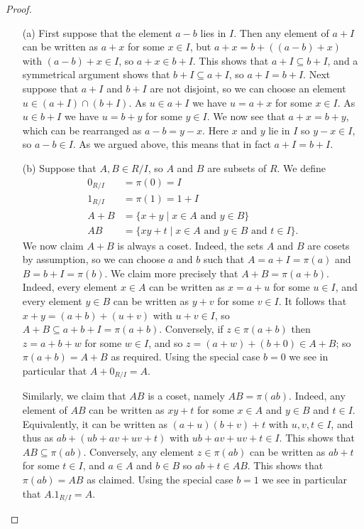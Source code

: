 \documentclass{amsart}
\newcommand{\st}        {\;|\;}
\newcommand{\sse}       {\subseteq}
\renewcommand{\:}{\colon}
\theoremstyle{definition}
\begin{document}
\begin{proof}
 \begin{itemize}
  \item[(a)] First suppose that the element $a-b$ lies in $I$.
   Then any element of $a+I$ can be written as $a+x$ for some
   $x\in I$,  but $a+x=b+((a-b)+x)$ with $(a-b)+x\in I$, so
   $a+x\in b+I$.  This shows that $a+I\sse b+I$, and a symmetrical
   argument shows that $b+I\sse a+I$, so $a+I=b+I$.  Next suppose that
   $a+I$ and $b+I$ are not disjoint, so we can choose an element
   $u\in(a+I)\cap(b+I)$.  As $u\in a+I$ we have $u=a+x$ for some
   $x\in I$.  As $u\in b+I$ we have $u=b+y$ for some $y\in I$.  We now
   see that $a+x=b+y$, which can be rearranged as $a-b=y-x$.  Here $x$
   and $y$ lie in $I$ so $y-x\in I$, so $a-b\in I$.  As we argued
   above, this means that in fact $a+I=b+I$.
  \item[(b)] Suppose that $A,B\in R/I$, so $A$ and $B$ are subsets of
   $R$.  We define 
   \begin{align*}
    0_{R/I} &= \pi(0) = I \\
    1_{R/I} &= \pi(1) = 1 + I \\
    A+B &= \{x+y\st x\in A\text{ and } y\in B\} \\
    AB &= \{xy+t\st x\in A\text{ and } y\in B \text{ and } t\in I\}.
   \end{align*}
   We now claim $A+B$ is always a coset.  Indeed, the sets $A$ and $B$
   are cosets by assumption, so we can choose $a$ and $b$ such that
   $A=a+I=\pi(a)$ and $B=b+I=\pi(b)$.  We claim more precisely that
   $A+B=\pi(a+b)$.  Indeed, every element $x\in A$ can be written as
   $x=a+u$ for some $u\in I$, and every element $y\in B$ can be
   written as $y+v$ for some $v\in I$.  It follows that
   $x+y=(a+b)+(u+v)$ with $u+v\in I$, so $A+B\sse a+b+I=\pi(a+b)$.
   Conversely, if $z\in\pi(a+b)$ then $z=a+b+w$ for some $w\in I$,
   and so $z=(a+w)+(b+0)\in A+B$; so $\pi(a+b)=A+B$ as required.
   Using the special case $b=0$ we see in particular that
   $A+0_{R/I}=A$. 

   Similarly, we claim that $AB$ is a coset, namely $AB=\pi(ab)$.
   Indeed, any element of $AB$ can be written as $xy+t$ for some
   $x\in A$ and $y\in B$ and $t\in I$.  Equivalently, it can be
   written as $(a+u)(b+v)+t$ with $u,v,t\in I$, and thus as
   $ab+(ub+av+uv+t)$ with $ub+av+uv+t\in I$.  This shows that
   $AB\sse\pi(ab)$.  Conversely, any element $z\in\pi(ab)$ can be
   written as $ab+t$ for some $t\in I$, and $a\in A$ and $b\in B$ so
   $ab+t\in AB$.  This shows that $\pi(ab)=AB$ as claimed.  
   Using the special case $b=1$ we see in particular that
   $A.1_{R/I}=A$. 


\end{itemize}
\end{proof}
\end{document}

